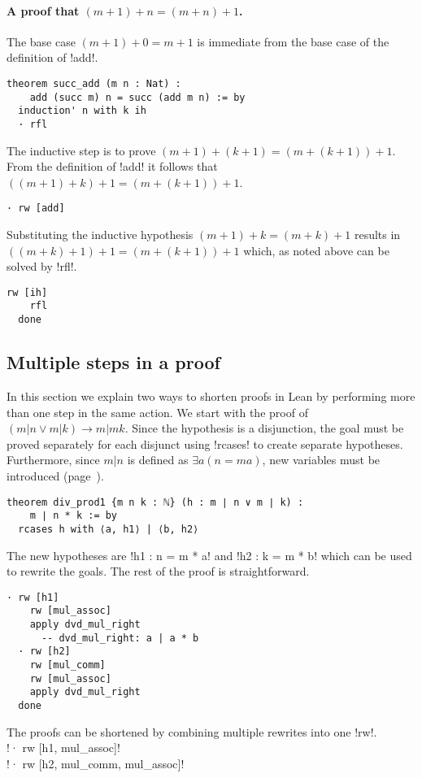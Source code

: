 \paragraph{A proof that $(m+1)+n = (m+n)+1$.}
The base case $(m+1)+0=m+1$ is immediate from the base case of the definition of !add!.
\begin{Verbatim}[firstnumber=last]
theorem succ_add (m n : Nat) :
    add (succ m) n = succ (add m n) := by
  induction' n with k ih
  · rfl
\end{Verbatim}

The inductive step is to prove $(m+1) + (k+1) = (m + (k+1)) + 1$. From the definition of !add! it follows that $((m+1) + k) + 1 = (m + (k+1)) + 1$.
\begin{Verbatim}[firstnumber=last]
  · rw [add]
\end{Verbatim}
Substituting the inductive hypothesis $(m+1) + k = (m+k) + 1$ results in $((m+k) + 1) + 1 = (m + (k+1)) + 1$ which, as noted above can be solved by !rfl!.
\begin{Verbatim}[firstnumber=last]
    rw [ih]
    rfl
  done
\end{Verbatim}

\subsection{Multiple steps in a proof}

In this section we explain two ways to shorten proofs in Lean by performing more than one step in the same action. We start with the proof of $(m|n \vee m|k) \rightarrow m | mk$. Since the hypothesis is a disjunction, the goal must be proved separately for each disjunct using !rcases! to create separate hypotheses. Furthermore, since $m|n$ is defined as $\exists a (n=ma)$, new variables must be introduced (page~\pageref{p.rcases}).
\begin{Verbatim}
theorem div_prod1 {m n k : ℕ} (h : m ∣ n ∨ m ∣ k) :
    m ∣ n * k := by
  rcases h with ⟨a, h1⟩ | ⟨b, h2⟩
\end{Verbatim}
The new hypotheses are !h1 : n = m * a! and !h2 : k = m * b! which can be used to rewrite the goals. The rest of the proof is straightforward.
\begin{Verbatim}[firstnumber=last]
  · rw [h1]
    rw [mul_assoc]
    apply dvd_mul_right
      -- dvd_mul_right: a | a * b
  · rw [h2]
    rw [mul_comm]
    rw [mul_assoc]
    apply dvd_mul_right
  done
\end{Verbatim}

The proofs can be shortened by combining multiple rewrites into one !rw!.\\
\indnt{}!· rw [h1, mul_assoc]!\\
\indnt{}!· rw [h2, mul_comm, mul_assoc]!

